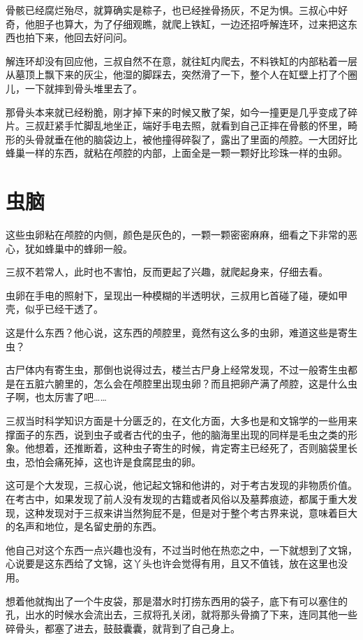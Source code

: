 骨骸已经腐烂殆尽，就算确实是粽子，也已经挫骨扬灰，不足为惧。三叔心中好奇，他胆子也算大，为了仔细观瞧，就爬上铁缸，一边还招呼解连环，过来把这东西也拍下来，他回去好问问。

解连环却没有回应他，三叔自然不在意，就往缸内爬去，不料铁缸的内部粘着一层从墓顶上飘下来的灰尘，他湿的脚踩去，突然滑了一下，整个人在缸壁上打了个圈儿，一下就摔到骨头堆里去了。

那骨头本来就已经粉脆，刚才掉下来的时候又散了架，如今一撞更是几乎变成了碎片。三叔赶紧手忙脚乱地坐正，端好手电去照，就看到自己正摔在骨骸的怀里，畸形的头骨就垂在他的脑袋边上，被他撞得碎裂了，露出了里面的颅腔。一大团好比蜂巢一样的东西，就粘在颅腔的内部，上面全是一颗一颗好比珍珠一样的虫卵。

\chapter{虫脑}

这些虫卵粘在颅腔的内侧，颜色是灰色的，一颗一颗密密麻麻，细看之下非常的恶心，犹如蜂巢中的蜂卵一般。

三叔不若常人，此时也不害怕，反而更起了兴趣，就爬起身来，仔细去看。

虫卵在手电的照射下，呈现出一种模糊的半透明状，三叔用匕首碰了碰，硬如甲壳，似乎已经干透了。

这是什么东西？他心说，这东西的颅腔里，竟然有这么多的虫卵，难道这些是寄生虫？

古尸体内有寄生虫，那倒也说得过去，楼兰古尸身上经常发现，不过一般寄生虫都是在五脏六腑里的，怎么会在颅腔里出现虫卵？而且把卵产满了颅腔，这是什么虫子啊，也太厉害了吧……

三叔当时科学知识方面是十分匮乏的，在文化方面，大多也是和文锦学的一些用来撑面子的东西，说到虫子或者古代的虫子，他的脑海里出现的同样是毛虫之类的形象。他想着，还推断着，这种虫子寄生的时候，肯定寄主已经死了，否则脑袋里长虫，恐怕会痛死掉，这也许是食腐昆虫的卵。

这可是个大发现，三叔心说，他记起文锦和他讲的，对于考古发现的非物质价值。在考古中，如果发现了前人没有发现的古籍或者风俗以及墓葬痕迹，都属于重大发现，这种发现对于三叔来讲当然狗屁不是，但是对于整个考古界来说，意味着巨大的名声和地位，是名留史册的东西。

他自己对这个东西一点兴趣也没有，不过当时他在热恋之中，一下就想到了文锦，心说要是这东西给了文锦，这丫头也许会觉得有用，且又不值钱，放在这里也没用。

想着他就掏出了一个牛皮袋，那是潜水时打捞东西用的袋子，底下有可以塞住的孔，出水的时候水会流出去，三叔将孔关闭，就将那头骨摘了下来，连同其他一些碎骨头，都塞了进去，鼓鼓囊囊，就背到了自己身上。

